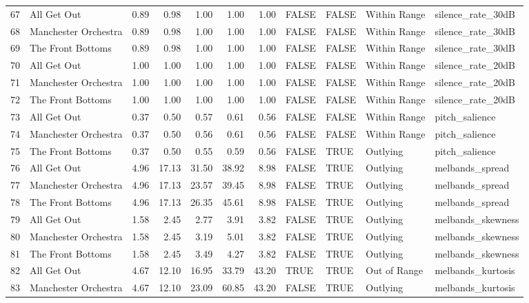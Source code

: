 \begin{table}[ht]
\begin{tabular}{rlrrrrrllll}
  67 & All Get Out & 0.89 & 0.98 & 1.00 & 1.00 & 1.00 & FALSE & FALSE & Within Range & silence\_rate\_30dB \\ 
  68 & Manchester Orchestra & 0.89 & 0.98 & 1.00 & 1.00 & 1.00 & FALSE & FALSE & Within Range & silence\_rate\_30dB \\ 
  69 & The Front Bottoms & 0.89 & 0.98 & 1.00 & 1.00 & 1.00 & FALSE & FALSE & Within Range & silence\_rate\_30dB \\ 
  70 & All Get Out & 1.00 & 1.00 & 1.00 & 1.00 & 1.00 & FALSE & FALSE & Within Range & silence\_rate\_20dB \\ 
  71 & Manchester Orchestra & 1.00 & 1.00 & 1.00 & 1.00 & 1.00 & FALSE & FALSE & Within Range & silence\_rate\_20dB \\ 
  72 & The Front Bottoms & 1.00 & 1.00 & 1.00 & 1.00 & 1.00 & FALSE & FALSE & Within Range & silence\_rate\_20dB \\ 
  73 & All Get Out & 0.37 & 0.50 & 0.57 & 0.61 & 0.56 & FALSE & FALSE & Within Range & pitch\_salience \\ 
  74 & Manchester Orchestra & 0.37 & 0.50 & 0.56 & 0.61 & 0.56 & FALSE & FALSE & Within Range & pitch\_salience \\ 
  75 & The Front Bottoms & 0.37 & 0.50 & 0.55 & 0.59 & 0.56 & FALSE & TRUE & Outlying & pitch\_salience \\ 
  76 & All Get Out & 4.96 & 17.13 & 31.50 & 38.92 & 8.98 & FALSE & TRUE & Outlying & melbands\_spread \\ 
  77 & Manchester Orchestra & 4.96 & 17.13 & 23.57 & 39.45 & 8.98 & FALSE & TRUE & Outlying & melbands\_spread \\ 
  78 & The Front Bottoms & 4.96 & 17.13 & 26.35 & 45.61 & 8.98 & FALSE & TRUE & Outlying & melbands\_spread \\ 
  79 & All Get Out & 1.58 & 2.45 & 2.77 & 3.91 & 3.82 & FALSE & TRUE & Outlying & melbands\_skewness \\ 
  80 & Manchester Orchestra & 1.58 & 2.45 & 3.19 & 5.01 & 3.82 & FALSE & TRUE & Outlying & melbands\_skewness \\ 
  81 & The Front Bottoms & 1.58 & 2.45 & 3.49 & 4.27 & 3.82 & FALSE & TRUE & Outlying & melbands\_skewness \\ 
  82 & All Get Out & 4.67 & 12.10 & 16.95 & 33.79 & 43.20 & TRUE & TRUE & Out of Range & melbands\_kurtosis \\ 
  83 & Manchester Orchestra & 4.67 & 12.10 & 23.09 & 60.85 & 43.20 & FALSE & TRUE & Outlying & melbands\_kurtosis \\ 

\end{tabular}
\end{table}

